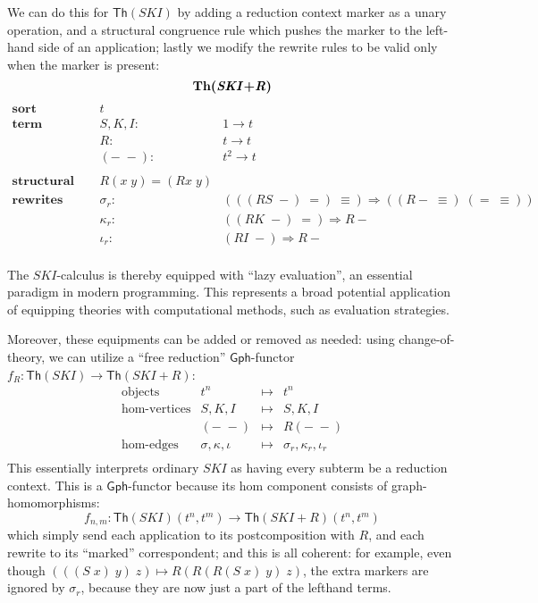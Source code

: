 \documentclass{amsart}
\theoremstyle{definition}
\newcommand{\Th}{\mathsf{Th}}
\newcommand{\Gph}{\mathsf{Gph}}
\newcommand{\maps}{\colon}
\begin{document}
We can do this for $\Th(SKI)$ by adding a reduction context marker as a unary operation, and a structural congruence rule which pushes the marker to the left-hand side of an application; lastly we modify the rewrite rules to be valid only when the marker is present:
$$\textbf{Th(\textit{SKI}+\textit{R})}$$
\[\begin{array}{rcl}
\textbf{sort} & t &\\
\textbf{term constructors} & S,K,I \maps &1 \to t\\
& R\maps & t \to t\\
& (-\; -)\maps & t^2 \to t\\\\
\textbf{structural congruence} & R(x\; y) = (Rx\; y) &\\
\textbf{rewrites} & \sigma_r\maps & (((RS\; -)\; =)\; \equiv) \Rightarrow ((R-\; \equiv)\; (=\; \equiv))\\
& \kappa_r\maps & ((RK\; -)\; =) \Rightarrow R-\\
& \iota_r\maps & (RI\; -) \Rightarrow R-\\
\end{array}\]

The $SKI$-calculus is thereby equipped with ``lazy evaluation'', an essential paradigm in modern programming. This represents a broad potential application of equipping theories with computational methods, such as evaluation strategies.

Moreover, these equipments can be added or removed as needed: using change-of-theory, we can utilize a ``free reduction'' $\Gph$-functor $f_R\maps\Th(SKI)\to \Th(SKI+R)$:
\[\begin{array}{rrcl}
\text{objects} & t^n & \mapsto & t^n\\
\text{hom-vertices} & S,K,I & \mapsto & S,K,I\\
& (-\; -) & \mapsto & R(-\; -)\\
\text{hom-edges} & \sigma, \kappa, \iota & \mapsto & \sigma_r, \kappa_r, \iota_r\\
\end{array}\]
This essentially interprets ordinary $SKI$ as having every subterm be a reduction context. This is a $\Gph$-functor because its hom component consists of graph-homomorphisms: $$f_{n,m}\maps \Th(SKI)(t^n,t^m) \to \Th(SKI+R)(t^n,t^m)$$ which simply send each application to its postcomposition with $R$, and each rewrite to its ``marked'' correspondent; and this is all coherent: for example, even though $(((S\; x)\; y)\; z) \mapsto R(R(R(S\; x)\; y)\; z)$, the extra markers are ignored by $\sigma_r$, because they are now just a part of the lefthand terms.
\end{document}
